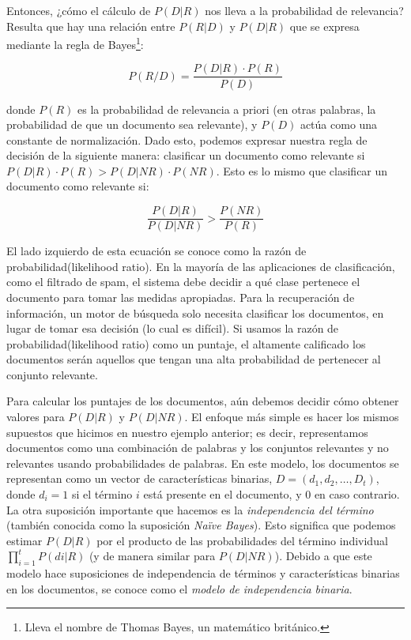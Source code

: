 Entonces, ¿cómo el cálculo de $P (D | R)$ nos lleva a la probabilidad de relevancia? Resulta que hay una relación entre $P (R | D)$ y $P (D | R)$ que se expresa mediante la regla de Bayes\footnote{Lleva el nombre de Thomas Bayes, un matemático británico.}:

$$P(R/D) = \frac{P(D|R)\cdot P(R)}{P(D)}$$


donde $P (R)$ es la probabilidad de relevancia a priori (en otras palabras, la probabilidad de que un documento sea relevante), y $P (D)$ actúa como una constante de normalización. Dado esto, podemos expresar nuestra regla de decisión de la siguiente manera: clasificar un documento como relevante si $P (D | R)\cdot P (R)> P (D | NR)\cdot P (NR)$. Esto es lo mismo que 
clasificar un documento como relevante si:

$$\frac{P(D|R)}{P(D|NR)} > \frac{P(NR)}{P(R)}$$

El lado izquierdo de esta ecuación se conoce como la razón de probabilidad(likelihood ratio). En la mayoría de las aplicaciones de clasificación, como el filtrado de spam, el sistema debe decidir a qué clase pertenece el documento para tomar las medidas apropiadas. Para la recuperación de información, un motor de búsqueda solo necesita clasificar los documentos, en lugar de tomar esa decisión (lo cual es difícil). Si usamos la razón de probabilidad(likelihood ratio) como un puntaje, el altamente calificado
los documentos serán aquellos que tengan una alta probabilidad de pertenecer al conjunto relevante.

Para calcular los puntajes de los documentos, aún debemos decidir cómo obtener valores para $P (D | R)$ y $P (D | NR)$. El enfoque más simple es hacer los mismos supuestos que hicimos en nuestro ejemplo anterior; es decir, representamos documentos como una combinación de palabras y los conjuntos relevantes y no relevantes usando probabilidades de palabras. En este modelo, los documentos se representan como un vector de características binarias, $D = (d_1, d_2,\dots, D_t)$, donde $d_i = 1$ si el término $i$ está presente en el documento, y $0$ en caso contrario. La otra suposición importante que hacemos es la \textit{independencia del término} (también conocida como la suposición \textit{Naïve Bayes}). Esto significa que podemos estimar $P (D | R)$ por el producto de las probabilidades del término individual $\prod_{i = 1}^{t} P (di | R)$ (y de manera similar para $P (D | NR)$). Debido a que este modelo hace suposiciones de independencia de términos y características binarias en los documentos, se conoce como el \textit{modelo de independencia binaria}.

